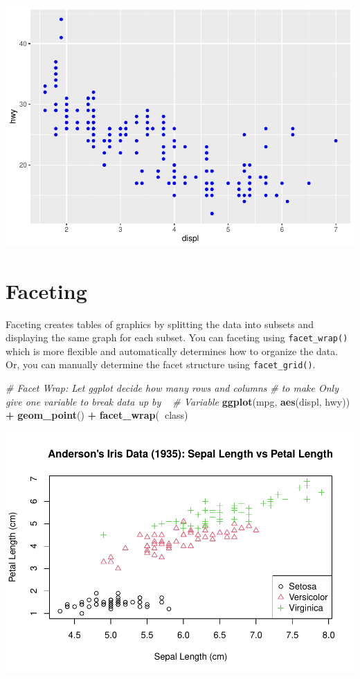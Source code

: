 \documentclass[
]{book}
\newenvironment{Shaded}{\begin{snugshade}}{\end{snugshade}}
\newcommand{\CommentTok}[1]{\textcolor[rgb]{0.56,0.35,0.01}{\textit{#1}}}
\newcommand{\KeywordTok}[1]{\textcolor[rgb]{0.13,0.29,0.53}{\textbf{#1}}}
\newcommand{\NormalTok}[1]{#1}
\newcommand{\OperatorTok}[1]{\textcolor[rgb]{0.81,0.36,0.00}{\textbf{#1}}}
\newcommand{\StringTok}[1]{\textcolor[rgb]{0.31,0.60,0.02}{#1}}
\begin{document}
\includegraphics{_main_files/figure-latex/unnamed-chunk-253-3.pdf}

\hypertarget{faceting}{%
\section{Faceting}\label{faceting}}

Faceting creates tables of graphics by splitting the data into subsets and displaying the same graph for each subset. You can faceting using \texttt{facet\_wrap()} which is more flexible and automatically determines how to organize the data. Or, you can manually determine the facet structure using \texttt{facet\_grid()}.

\begin{Shaded}
\begin{Highlighting}[]
\CommentTok{# Facet Wrap: Let ggplot decide how many rows and columns}
\CommentTok{# to make Only give one variable to break data up by ~}
\CommentTok{# Variable}
\KeywordTok{ggplot}\NormalTok{(mpg, }\KeywordTok{aes}\NormalTok{(displ, hwy)) }\OperatorTok{+}\StringTok{ }\KeywordTok{geom_point}\NormalTok{() }\OperatorTok{+}\StringTok{ }\KeywordTok{facet_wrap}\NormalTok{(}\OperatorTok{~}\NormalTok{class)}
\end{Highlighting}
\end{Shaded}

\includegraphics{_main_files/figure-latex/unnamed-chunk-254-1.pdf}
\end{document}
